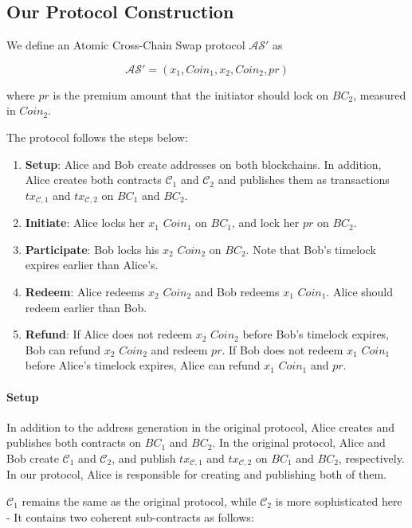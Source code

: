 \subsection{Our Protocol Construction}

We define an Atomic Cross-Chain Swap protocol $\mathcal{AS}'$ as

$$\mathcal{AS}' = (x_1, Coin_1, x_2, Coin_2, pr)$$

where $pr$ is the premium amount that the initiator should lock on $BC_2$, measured in $Coin_2$.

The protocol follows the steps below:

\begin{enumerate}
    \item \textbf{Setup}: Alice and Bob create addresses on both blockchains.
    In addition, Alice creates both contracts $\mathcal{C}_1$ and $\mathcal{C}_2$ and publishes them as transactions $tx_{\mathcal{C}, 1}$ and $tx_{\mathcal{C}, 2}$ on $BC_1$ and $BC_2$. 
    \item \textbf{Initiate}: Alice locks her $x_1$ $Coin_1$ on $BC_1$, and lock her $pr$ on $BC_2$.
    \item \textbf{Participate}: Bob locks his $x_2$ $Coin_2$ on $BC_2$. Note that Bob's timelock expires earlier than Alice's.
    \item \textbf{Redeem}: Alice redeems $x_2$ $Coin_2$ and Bob redeems $x_1$ $Coin_1$. Alice should redeem earlier than Bob.
    \item \textbf{Refund}: If Alice does not redeem $x_2$ $Coin_2$ before Bob's timelock expires, Bob can refund $x_2$ $Coin_2$ and redeem $pr$.
    If Bob does not redeem $x_1$ $Coin_1$ before Alice's timelock expires, Alice can refund $x_1$ $Coin_1$ and $pr$.
\end{enumerate}

\paragraph{Setup}
In addition to the address generation in the original protocol,
Alice creates and publishes both contracts on $BC_1$ and $BC_2$.
In the original protocol, Alice and Bob create $\mathcal{C}_1$ and $\mathcal{C}_2$, and publish $tx_{\mathcal{C}, 1}$ and $tx_{\mathcal{C}, 2}$ on $BC_1$ and $BC_2$, respectively.
In our protocol, Alice is responsible for creating and publishing both of them.

$\mathcal{C}_1$ remains the same as the original protocol, while $\mathcal{C}_2$ is more sophisticated here - It contains two coherent sub-contracts as follows:

